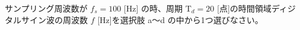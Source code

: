 サンプリング周波数が $f_s = 100$ [Hz] の時、周期 $\textrm{T}_d = 20$ [点]の時間領域ディジタルサイン波の周波数 $f$ [Hz]を選択肢 a〜d の中から1つ選びなさい。
